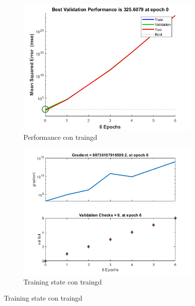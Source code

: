 \documentclass[a4paper, 12pt]{article}
\begin{document}
                \begin{figure}[htp!]
                    \caption{Gráficas con Descenso gradiente con división 60/20/20}
                    \begin{subfigure}{0.49\textwidth}
                        \centering
        		      \includegraphics[width=\textwidth]{figures/parte1/Ej3/Ej3_performance_traingd_60.png}
                        \caption{Performance con traingd}
                    \end{subfigure}
                    \begin{subfigure}{0.49\textwidth}
                        \includegraphics[width=\textwidth]{figures/parte1/Ej3/Ej3_training_state_traingd_60.png}
                        \caption{Training state con traingd}

\end{subfigure}
\end{figure}
\end{document}
